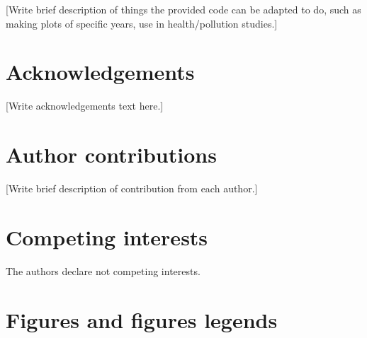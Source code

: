 \documentclass[english]{article}
\begin{document}

[Write brief description of things the provided code can be adapted to do, such as making plots of specific years, use in health/pollution studies.]

\section*{Acknowledgements}


[Write acknowledgements text here.]

\section*{Author contributions}


[Write brief description of contribution from each author.]

\section*{Competing interests}


The authors declare not competing interests.

\section*{Figures and figures legends}

\end{document}
